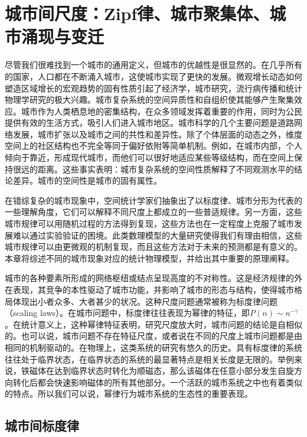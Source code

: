 \chapter{城市间尺度：Zipf律、城市聚集体、城市涌现与变迁}

尽管我们很难找到一个城市的通用定义，但城市的优越性是很显然的。在几乎所有的国家，人口都在不断涌入城市，这使城市实现了更快的发展。微观增长动态如何塑造区域增长的宏观趋势的固有性质引起了经济学，城市研究，流行病传播和统计物理学研究的极大兴趣。城市复杂系统的空间异质性和自组织使其能够产生聚集效应\cite{Keuschnigg13759}。城市作为人类栖息地的密集结构，在众多领域发挥着重要的作用，同时为公民提供有效的生活方式，吸引人们进入城市地区。城市科学的几个主要问题是道路网络发展，城市扩张以及城市之间的共性和差异性。除了个体层面的动态之外，维度空间上的社区结构也不完全等同于偏好依附等简单机制。例如，在城市内部，个人倾向于靠近，形成现代城市，而他们可以很好地适应某些等级结构，而在空间上保持很远的距离。这些事实表明：城市复杂系统的空间性质解释了不同观测水平的结论差异。城市的空间性是城市的固有属性。

在错综复杂的城市现象中，空间统计学家们抽象出了以标度律、城市分形为代表的一些理解角度，它们可以解释不同尺度上都成立的一些普适规律。另一方面，这些城市规律可以用随机过程的方法得到复现，这些方法也在一定程度上克服了城市发展难以通过实验验证的困境。此类数理模型的大量研究使得我们有理由相信，这些城市规律可以由更微观的机制复现，而且这些方法对于未来的预测都是有意义的。本章将综述不同的城市现象对应的统计物理模型，并给出其中重要的原理阐释。

城市的各种要素所形成的网络枢纽或结点呈现高度的不对称性。这是经济规律的外在表现\cite{BerryThe}，其竞争的本性驱动了城市功能，并影响了城市的形态与结构，使得城市格局体现出小者众多、大者甚少的状况。这种尺度问题通常被称为标度律问题（scaling laws）。在城市问题中，标度律往往表现为幂律的特征，即$P(n)\sim n^{-\gamma}$。在统计意义上，这种幂律特征表明，研究尺度放大时，城市问题的结论是自相似的。也可以说，城市问题不存在特征尺度，或者说在不同的尺度上城市问题都是由相同的机制驱动的。在物理上，这类系统的研究有悠久的历史。具有标度律的系统往往处于临界状态，在临界状态的系统的最显著特点是相关长度是无限的。举例来说，铁磁体在达到临界状态时转化为顺磁态，那么该磁体在任意小部分发生自旋方向转化后都会快速影响磁体的所有其他部分。一个活跃的城市系统之中也有着类似的特点。所以我们可以说，幂律行为城市系统的生态性的重要表现。

\section{城市间标度律}

